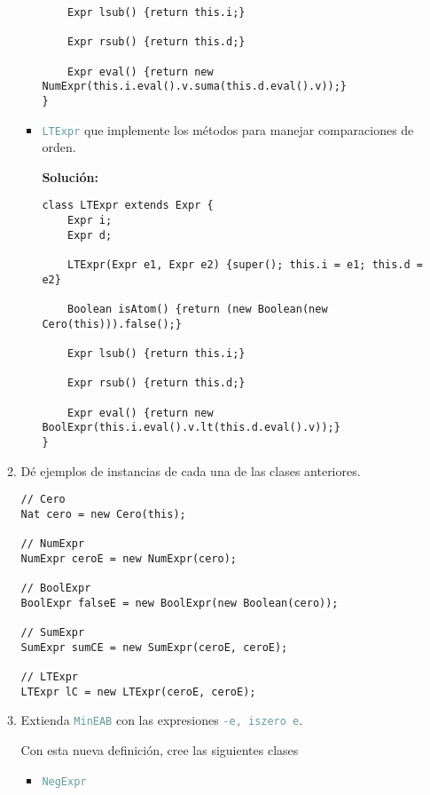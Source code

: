 \documentclass{article}
\newcommand{\tp}[1]{\textcolor{CadetBlue} {\texttt{#1}}}
\newcommand{\tb}[1]{\textcolor{RoyalPurple} {\textbf{#1}}}
\begin{document}
\begin{enumerate}
\begin{enumerate}
\begin{itemize}
\begin{verbatim}
    Expr lsub() {return this.i;}
    
    Expr rsub() {return this.d;}

    Expr eval() {return new NumExpr(this.i.eval().v.suma(this.d.eval().v));}
}
                \end{verbatim}

                \item \tp{LTExpr} que implemente los métodos para manejar
                comparaciones de orden.

                \tb{Solución:}

                \begin{verbatim}
class LTExpr extends Expr {
    Expr i;
    Expr d;

    LTExpr(Expr e1, Expr e2) {super(); this.i = e1; this.d = e2}

    Boolean isAtom() {return (new Boolean(new Cero(this))).false();}

    Expr lsub() {return this.i;}
    
    Expr rsub() {return this.d;}

    Expr eval() {return new BoolExpr(this.i.eval().v.lt(this.d.eval().v));}
}
                \end{verbatim}

            \end{itemize}

            \item Dé ejemplos de instancias de cada una de las clases
            anteriores.

            \begin{verbatim}
// Cero
Nat cero = new Cero(this);

// NumExpr
NumExpr ceroE = new NumExpr(cero);

// BoolExpr
BoolExpr falseE = new BoolExpr(new Boolean(cero));

// SumExpr
SumExpr sumCE = new SumExpr(ceroE, ceroE);

// LTExpr
LTExpr lC = new LTExpr(ceroE, ceroE);
            \end{verbatim}

            \item Extienda \tp{MinEAB} con las expresiones \tp{-e, iszero e}.

            Con esta nueva definición, cree las siguientes clases

            \begin{itemize}
                \item \tp{NegExpr}


\end{itemize}
\end{enumerate}
\end{enumerate}
\end{document}
